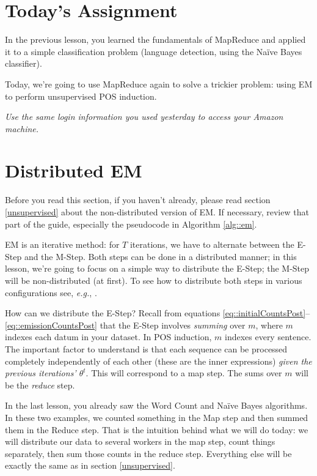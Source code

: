 \section*{Today's Assignment}
In the previous lesson, you learned the fundamentals of MapReduce and applied
it to a simple classification problem (language detection, using the Na\"{i}ve
Bayes classifier).

Today, we're going to use MapReduce again to solve a trickier
problem: using EM to perform unsupervised POS induction.

\emph{Use the same login information you used yesterday to access your Amazon
machine.}

\section{Distributed EM}

Before you read this section, if you haven't already, please read section
\ref{unsupervised} about the non-distributed version of EM. If necessary,
review that part of the guide, especially the pseudocode in Algorithm
\ref{alg::em}.

EM is an iterative method: for $T$ iterations, we have to alternate between the
E-Step and the M-Step. Both steps can be done in a distributed manner; in this
lesson, we're going to focus on a simple way to distribute the E-Step; the
M-Step will be non-distributed (at first). To see how to distribute both steps
in various configurations see, \emph{e.g.}, \cite{Wolfe2008}.

How can we distribute the E-Step? Recall from equations
\eqref{eq::initialCountsPost}--\eqref{eq::emissionCountsPost} that the E-Step
involves \emph{summing} over $m$, where $m$ indexes each datum in your dataset.
In POS induction, $m$ indexes every sentence. The important factor to
understand is that each sequence can be processed completely independently of
each other (these are the inner expressions) \emph{given the previous
iterations' $\theta^t$}. This will correspond to a map step. The sums over $m$
will be the \emph{reduce} step.

In the last lesson, you already saw the Word Count and Na\"{i}ve Bayes
algorithms. In these two examples, we counted something in the Map step and
then summed them in the Reduce step. That is the intuition behind what we will
do today: we will distribute our data to several workers in the map step, count
things separately, then sum those counts in the reduce step. Everything else
will be exactly the same as in section \ref{unsupervised}.

